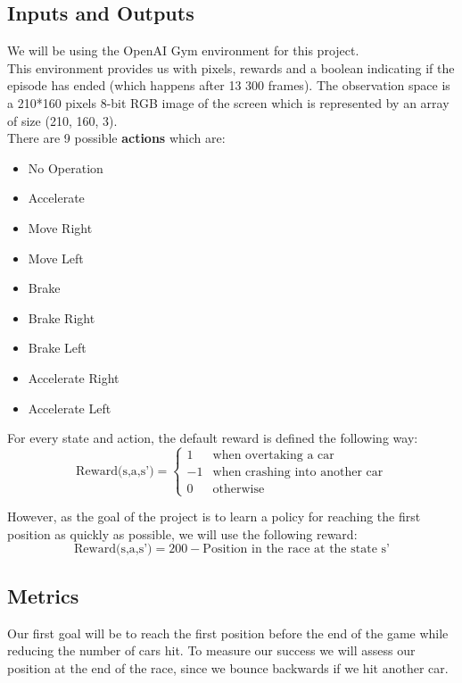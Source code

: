 \documentclass[10pt,twocolumn,letterpaper]{article}
\begin{document}
\subsection{Inputs and Outputs}

We will be using the OpenAI Gym environment for this project. \\
This environment provides us with pixels, rewards and a boolean indicating if the episode has ended (which happens after 13 300 frames). The observation space is a 210*160 pixels 8-bit RGB image of the screen which is represented by an array of size (210, 160, 3).\\
There are 9 possible \textbf{actions} which are:
\begin{itemize}
\itemsep-0.2em 
\item No Operation
\item Accelerate
\item Move Right
\item Move Left
\item Brake
\item Brake Right
\item Brake Left
\item Accelerate Right
\item Accelerate Left
\end{itemize}

For every state and action, the default reward is defined the following way: \[ \text{Reward(s,a,s')} = \begin{cases}1 & \text{when overtaking a car}\\-1 & \text{when crashing into another car} \\0 & \text{otherwise}\end{cases}\]


However, as the goal of the project is to learn a policy for reaching the first position as quickly as possible, we will use the following reward:
\[\text{Reward(s,a,s')} = 200 - \text{Position in the race at the state s'}\]



\subsection{Metrics}

Our first goal will be to reach the first position before the end of the game while reducing the number of cars hit. To measure our success we will assess our position at the end of the race, since we bounce backwards if we hit another car.\\
\end{document}
